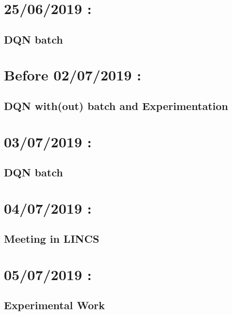 \documentclass[a4paper,10pt]{article}
\begin{document}
	\maketitle
	\tableofcontents

  	\newpage
  	\section{25/06/2019 :}
  		\subsection{DQN batch}
  			
  			
  	\section{Before 02/07/2019 :}
  		\subsection{DQN with(out) batch and Experimentation}
  			
  		
  	\section{03/07/2019 :}
  		\subsection{DQN batch}
  			 
  	
  	\section{04/07/2019 :}
  		\subsection{Meeting in LINCS}
  			
 
  	\section{05/07/2019 :}
  		\subsection{Experimental Work}
  			
  	
\end{document}

